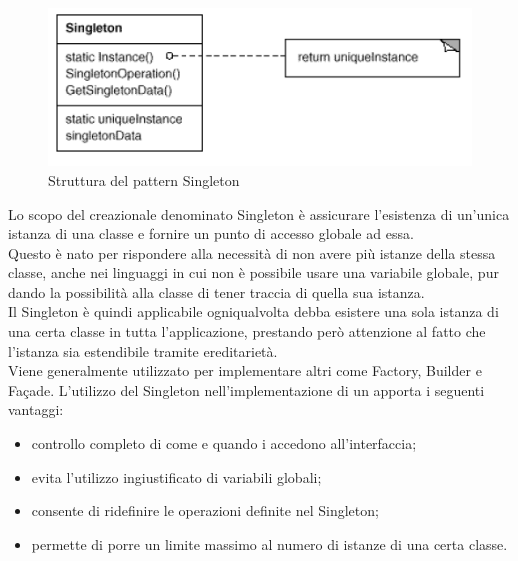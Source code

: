 	 \label{app:singleton}
	\begin{figure}[H]\centering
    \includegraphics[scale=0.7]{SpecificaTecnica/Pics/Singleton}
    \caption{Struttura del pattern Singleton}
	\end{figure}
	Lo scopo del  creazionale denominato Singleton è 
	assicurare l'esistenza di un'unica istanza di una classe e fornire
	un punto di accesso globale ad essa.\\
	Questo  è nato per rispondere alla necessità di non avere più
	istanze della stessa classe, anche nei linguaggi in cui non è possibile 
	usare una variabile globale, pur dando la possibilità alla classe di
	tener traccia di quella sua istanza.\\
	Il  Singleton è quindi applicabile ogniqualvolta debba esistere una 
	sola istanza di una certa classe in tutta l'applicazione, prestando però attenzione 
	al fatto che l'istanza sia estendibile tramite ereditarietà.\\
	Viene generalmente utilizzato per implementare altri  come Factory, 
	Builder e Façade.
		L'utilizzo del Singleton nell'implementazione di un  apporta i seguenti 
		vantaggi:
		\begin{itemize}
			\item controllo completo di come e quando i  accedono all'interfaccia;
			\item evita l'utilizzo ingiustificato di variabili globali;
			\item consente di ridefinire le operazioni definite nel Singleton;
			\item permette di porre un limite massimo al numero di istanze di una certa classe.
		\end{itemize}

